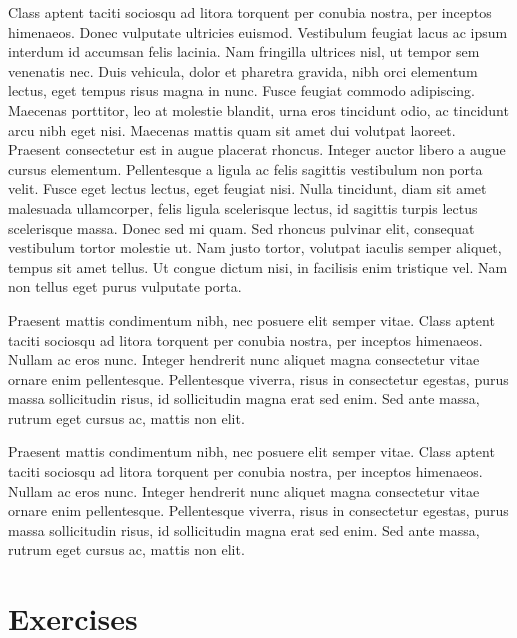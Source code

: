\begin{shaded}
Class aptent taciti sociosqu ad litora torquent per conubia nostra, per inceptos himenaeos. Donec vulputate ultricies euismod. Vestibulum feugiat lacus ac ipsum interdum id accumsan felis lacinia. Nam fringilla ultrices nisl, ut tempor sem venenatis nec. Duis vehicula, dolor et pharetra gravida, nibh orci elementum lectus, eget tempus risus magna in nunc. Fusce feugiat commodo adipiscing. Maecenas porttitor, leo at molestie blandit, urna eros tincidunt odio, ac tincidunt arcu nibh eget nisi. Maecenas mattis quam sit amet dui volutpat laoreet. Praesent consectetur est in augue placerat rhoncus. Integer auctor libero a augue cursus elementum. Pellentesque a ligula ac felis sagittis vestibulum non porta velit. Fusce eget lectus lectus, eget feugiat nisi. Nulla tincidunt, diam sit amet malesuada ullamcorper, felis ligula scelerisque lectus, id sagittis turpis lectus scelerisque massa. Donec sed mi quam. Sed rhoncus pulvinar elit, consequat vestibulum tortor molestie ut. Nam justo tortor, volutpat iaculis semper aliquet, tempus sit amet tellus. Ut congue dictum nisi, in facilisis enim tristique vel. Nam non tellus eget purus vulputate porta. 
\end{shaded}

\begin{shaded}
Praesent mattis condimentum nibh, nec posuere elit semper vitae. Class aptent taciti sociosqu ad litora torquent per conubia nostra, per inceptos himenaeos. Nullam ac eros nunc. Integer hendrerit nunc aliquet magna consectetur vitae ornare enim pellentesque. Pellentesque viverra, risus in consectetur egestas, purus massa sollicitudin risus, id sollicitudin magna erat sed enim. Sed ante massa, rutrum eget cursus ac, mattis non elit. 
\end{shaded}

\begin{shaded}
Praesent mattis condimentum nibh, nec posuere elit semper vitae. Class aptent taciti sociosqu ad litora torquent per conubia nostra, per inceptos himenaeos. Nullam ac eros nunc. Integer hendrerit nunc aliquet magna consectetur vitae ornare enim pellentesque. Pellentesque viverra, risus in consectetur egestas, purus massa sollicitudin risus, id sollicitudin magna erat sed enim. Sed ante massa, rutrum eget cursus ac, mattis non elit. 
\end{shaded}

\section{Exercises}

